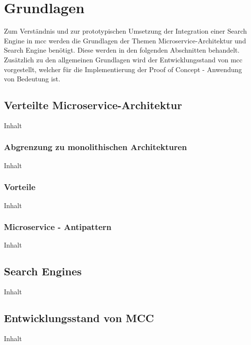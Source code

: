 \chapter{Grundlagen\label{chap2:Zweites-Kapitel}}

Zum Verständnis und zur prototypischen Umsetzung der Integration einer Search Engine in \gls{mcc} werden die Grundlagen der Themen \glqq Microservice-Architektur\grqq{} und \glqq Search Engine\grqq{} benötigt. Diese werden in den folgenden Abschnitten behandelt. Zusätzlich zu den allgemeinen Grundlagen wird der Entwicklungsstand von \gls{mcc} vorgestellt, welcher für die Implementierung der Proof of Concept - Anwendung von Bedeutung ist.

\section{Verteilte Microservice-Architektur\label{sec2.1:Unterpunkt-1}}

Inhalt

\subsection{Abgrenzung zu monolithischen Architekturen\label{subsec2.1.1:Unterunterpunkt-1}}

Inhalt

\subsection{Vorteile\label{subsec2.1.2:Unterunterpunkt-2}}

Inhalt

\subsection{Microservice - Antipattern\label{subsec2.1.3:Unterunterpunkt-3}}

Inhalt

\section{Search Engines\label{sec2.2:Unterpunkt-2}}

Inhalt

\section{Entwicklungsstand von MCC\label{sec2.3:Unterpunkt-3}}

Inhalt